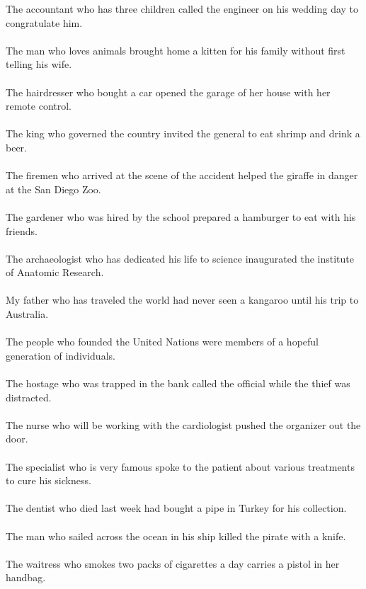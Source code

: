 The accountant who has three children called the engineer on his wedding day to congratulate him.	\\	\\
The man who loves animals brought home a kitten for his family without first telling his wife.	\\	\\
The hairdresser who bought a car opened the garage of her house with her remote control.	\\	\\
The king who governed the country invited the general to eat shrimp and drink a beer.	\\	\\
The firemen who arrived at the scene of the accident helped the giraffe in danger at the San Diego Zoo.	\\	\\
The gardener who was hired by the school prepared a hamburger to eat with his friends.	\\	\\
The archaeologist who has dedicated his life to science inaugurated the institute of Anatomic Research.	\\	\\
My father who has traveled the world had never seen a kangaroo until his trip to Australia.	\\	\\
The people who founded the United Nations were members of a hopeful generation of individuals.	\\	\\
The hostage who was trapped in the bank called the official while the thief was distracted.	\\	\\
The nurse who will be working with the cardiologist pushed the organizer out the door.	\\	\\
The specialist who is very famous spoke to the patient about various treatments to cure his sickness.	\\	\\
The dentist who died last week had bought a pipe in Turkey for his collection.	\\	\\
The man who sailed across the ocean in his ship killed the pirate with a knife.	\\	\\
The waitress who smokes two packs of cigarettes a day carries a pistol in her handbag.	\\	\\
